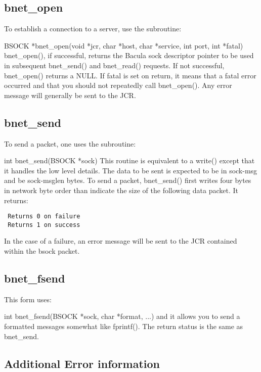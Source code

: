 \subsection*{bnet\_open}

To establish a connection to a server, use the subroutine: 

BSOCK *bnet\_open(void *jcr, char *host, char *service, int port,  int *fatal)
bnet\_open(), if successful, returns the Bacula sock descriptor pointer to be
used in subsequent bnet\_send() and bnet\_read() requests. If not successful,
bnet\_open() returns a NULL. If fatal is set on return, it means that a fatal
error occurred and that you should not repeatedly call bnet\_open(). Any error
message will generally be sent to the JCR. 

\subsection*{bnet\_send}

To send a packet, one uses the subroutine: 

int bnet\_send(BSOCK *sock) This routine is equivalent to a write() except
that it handles the low level details. The data to be sent is expected to be
in sock-\gt{}msg and be sock-\gt{}msglen bytes. To send a packet, bnet\_send()
first writes four bytes in network byte order than indicate the size of the
following data packet. It returns: 

\footnotesize
\begin{verbatim}
 Returns 0 on failure
 Returns 1 on success
\end{verbatim}
\normalsize

In the case of a failure, an error message will be sent to the JCR contained
within the bsock packet. 

\subsection*{bnet\_fsend}

This form uses: 

int bnet\_fsend(BSOCK *sock, char *format, ...) and it allows you to send a
formatted messages somewhat like fprintf(). The return status is the same as
bnet\_send. 

\subsection*{Additional Error information}

